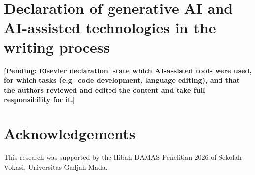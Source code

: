 \documentclass[preprint,12pt]{elsarticle}
\newcommand{\pending}[1]{\textcolor{pend}{\textbf{[Pending: #1]}}}
\begin{document}
\section*{Declaration of generative AI and AI-assisted technologies in the writing process}
\pending{Elsevier declaration: state which AI-assisted tools were used, for which tasks (e.g.\ code development, language editing),
and that the authors reviewed and edited the content and take full responsibility for it.}

\section*{Acknowledgements}
This research was supported by the Hibah DAMAS Penelitian 2026 of Sekolah Vokasi, Universitas Gadjah Mada.

\appendix




\end{document}
